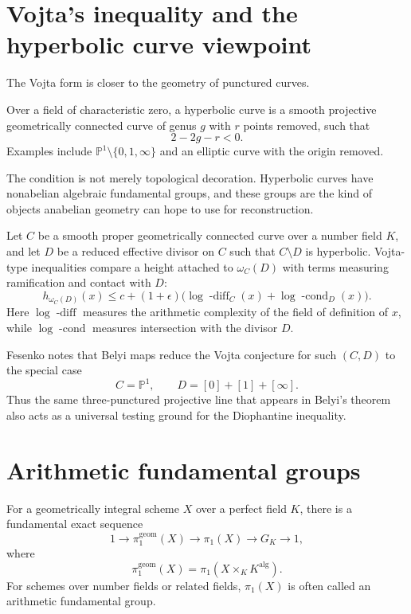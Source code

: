 \section{Vojta's inequality and the hyperbolic curve viewpoint}

The Vojta form is closer to the geometry of punctured curves.

\begin{definition}
Over a field of characteristic zero, a hyperbolic curve is a smooth projective geometrically connected curve of genus \(g\) with \(r\) points removed, such that
\[
  2-2g-r<0.
\]
Examples include \(\mathbb P^1\setminus\{0,1,\infty\}\) and an elliptic curve with the origin removed.
\end{definition}

The condition is not merely topological decoration.  Hyperbolic curves have nonabelian algebraic fundamental groups, and these groups are the kind of objects anabelian geometry can hope to use for reconstruction.

Let \(C\) be a smooth proper geometrically connected curve over a number field \(K\), and let \(D\) be a reduced effective divisor on \(C\) such that \(C\setminus D\) is hyperbolic.  Vojta-type inequalities compare a height attached to \(\omega_C(D)\) with terms measuring ramification and contact with \(D\):
\[
  h_{\omega_C(D)}(x)
  \leq
  c+(1+\epsilon)
  \bigl(\log\operatorname{-diff}_C(x)+\log\operatorname{-cond}_D(x)\bigr).
\]
Here \(\log\operatorname{-diff}\) measures the arithmetic complexity of the field of definition of \(x\), while \(\log\operatorname{-cond}\) measures intersection with the divisor \(D\).

\begin{remark}
Fesenko notes that Belyi maps reduce the Vojta conjecture for such \((C,D)\) to the special case
\[
  C=\mathbb P^1,\qquad D=[0]+[1]+[\infty].
\]
Thus the same three-punctured projective line that appears in Belyi's theorem also acts as a universal testing ground for the Diophantine inequality.
\end{remark}

\section{Arithmetic fundamental groups}

For a geometrically integral scheme \(X\) over a perfect field \(K\), there is a fundamental exact sequence
\[
  1\longrightarrow \pi_1^{\mathrm{geom}}(X)
  \longrightarrow \pi_1(X)
  \longrightarrow G_K
  \longrightarrow 1,
\]
where
\[
  \pi_1^{\mathrm{geom}}(X)=\pi_1(X\times_K K^{\mathrm{alg}}).
\]
For schemes over number fields or related fields, \(\pi_1(X)\) is often called an arithmetic fundamental group.

